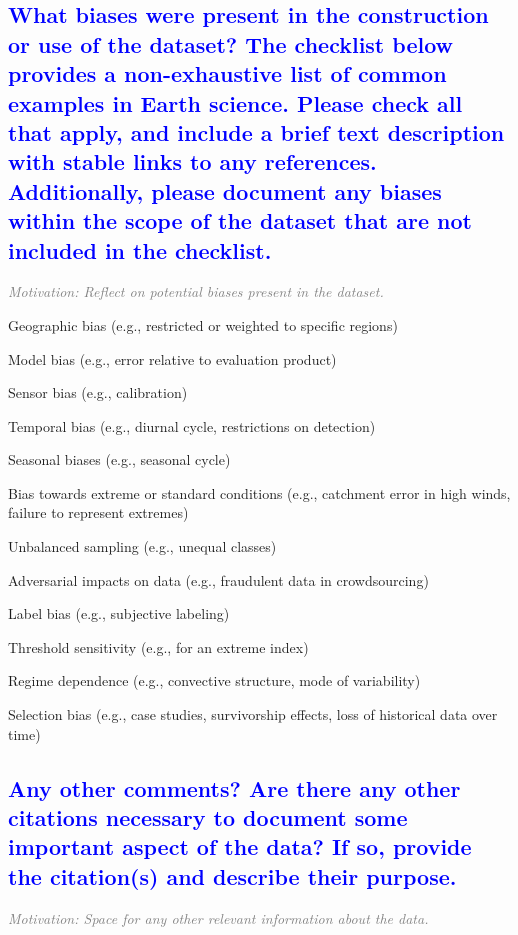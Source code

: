 \documentclass[letterpaper, 10 pt, transmag]{IEEEtran}
\begin{document}
\textcolor{blue}{\subsection{What biases were present in the construction or use of the dataset? The checklist below provides a non-exhaustive list of common examples in Earth science. Please check all that apply, and include a brief text description with stable links to any references. Additionally, please document any biases within the scope of the dataset that are not included in the checklist.}}
\textcolor{gray}{\textit{Motivation: Reflect on potential biases present in the dataset.}}

\begin{todolist}
    \item Geographic bias (e.g., restricted or weighted to specific regions)
    \item Model bias (e.g., error relative to evaluation product)
    \item Sensor bias (e.g., calibration)
    \item Temporal bias (e.g., diurnal cycle, restrictions on detection)
    \item Seasonal biases (e.g., seasonal cycle)
    \item Bias towards extreme or standard conditions (e.g., catchment error in high winds, failure to represent extremes)
    \item Unbalanced sampling (e.g., unequal classes)
    \item Adversarial impacts on data (e.g., fraudulent data in crowdsourcing)
    \item Label bias (e.g., subjective labeling)
    \item Threshold sensitivity (e.g., for an extreme index)
    \item Regime dependence (e.g., convective structure, mode of variability)
    \item Selection bias (e.g., case studies, survivorship effects, loss of historical data over time)
\end{todolist}

\textcolor{blue}{\subsection{Any other comments? Are there any other citations necessary to document some important aspect of the data? If so, provide the citation(s) and describe their purpose.}}
\textcolor{gray}{\textit{Motivation: Space for any other relevant information about the data.}}


\bigskip
 
  

\end{document}
